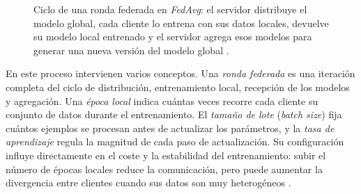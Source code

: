 \begin{figure}[htbp]
  \centering
  \caption{Ciclo de una ronda federada en \textit{FedAvg}: el servidor distribuye el
  modelo global, cada cliente lo entrena con sus datos locales, devuelve su modelo local
  entrenado y el servidor agrega esos modelos para generar una nueva versión del modelo
  global \parencite{mcmahan2017communication}.}
  \label{fig:ronda-federada}
\end{figure}

En este proceso intervienen varios conceptos. Una \textit{ronda federada} es una
iteración completa del ciclo de distribución, entrenamiento local, recepción de los
modelos y agregación. Una \textit{época local} indica cuántas veces recorre cada cliente
su conjunto de datos durante el entrenamiento. El \textit{tamaño de lote}
(\textit{batch size}) fija cuántos ejemplos se procesan antes de actualizar los
parámetros, y la \textit{tasa de aprendizaje} regula la magnitud de cada paso de
actualización. Su configuración influye directamente en el coste y la estabilidad del
entrenamiento: subir el número de épocas locales reduce la comunicación, pero puede
aumentar la divergencia entre clientes cuando sus datos son muy heterogéneos
\parencite{mcmahan2017communication}.

